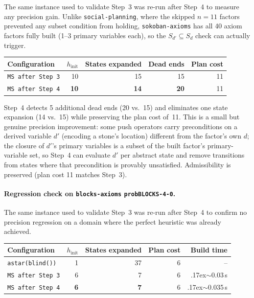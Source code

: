 \documentclass[11pt,a4paper]{article}
\begin{document}
\begin{itemize}
    The same instance used to validate Step~3 was re-run after Step~4 to
    measure any precision gain.  Unlike \texttt{social-planning}, where the
    skipped $n=11$ factors prevented any subset condition from holding,
    \texttt{sokoban-axioms} has all 40 axiom factors fully built
    (1--3 primary variables each), so the $S_{d'} \subseteq S_d$ check can
    actually trigger.

    \begin{center}
    \begin{tabular}{lrrrr}
    \toprule
    \textbf{Configuration} & \textbf{$h_{\mathrm{init}}$}
      & \textbf{States expanded} & \textbf{Dead ends} & \textbf{Plan cost} \\
    \midrule
    \texttt{MS after Step~3} & 10 & 15 & 15 & 11 \\
    \texttt{MS after Step~4} & \textbf{10} & \textbf{14} & \textbf{20} & 11 \\
    \bottomrule
    \end{tabular}
    \end{center}

    Step~4 detects 5 additional dead ends (20 vs.\ 15) and eliminates one
    state expansion (14 vs.\ 15) while preserving the plan cost of~11.
    This is a small but genuine precision improvement: some push operators
    carry preconditions on a derived variable $d'$ (encoding a stone's
    location) different from the factor's own $d$; the closure of $d'$'s
    primary variables is a subset of the built factor's primary-variable
    set, so Step~4 can evaluate $d'$ per abstract state and remove
    transitions from states where that precondition is provably unsatisfied.
    Admissibility is preserved (plan cost 11 matches Step~3).

    \paragraph{Regression check on \texttt{blocks-axioms} \texttt{probBLOCKS-4-0}.}

    The same instance used to validate Step~3 was re-run after Step~4 to
    confirm no precision regression on a domain where the perfect heuristic
    was already achieved.

    \begin{center}
    \begin{tabular}{lrrrr}
    \toprule
    \textbf{Configuration} & \textbf{$h_{\mathrm{init}}$}
      & \textbf{States expanded} & \textbf{Plan cost} & \textbf{Build time} \\
    \midrule
    \texttt{astar(blind())}       & 1 & 37 & 6 & -- \\
    \texttt{MS after Step~3}      & 6 &  7 & 6 & {\raise.17ex\hbox{$\scriptstyle\sim$}}0.03\,s \\
    \texttt{MS after Step~4}      & \textbf{6} & \textbf{7} & 6 & {\raise.17ex\hbox{$\scriptstyle\sim$}}0.035\,s \\
    \bottomrule
    \end{tabular}
    \end{center}


\end{itemize}
\end{document}
